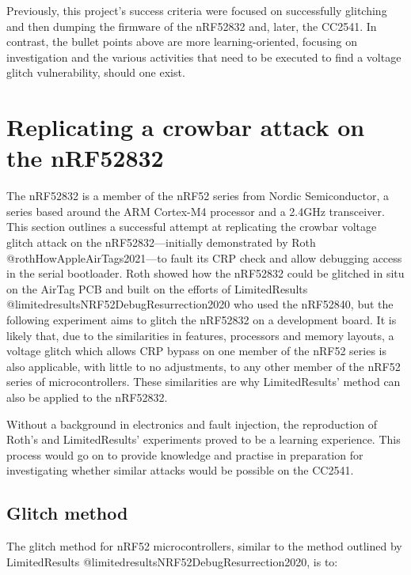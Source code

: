 Previously, this project's success criteria were focused on successfully
glitching and then dumping the firmware of the nRF52832 and, later, the
CC2541. In contrast, the bullet points above are more learning-oriented,
focusing on investigation and the various activities that need to be
executed to find a voltage glitch vulnerability, should one exist.

\hypertarget{replicating-a-crowbar-attack-on-the-nrf52832}{%
\section{Replicating a crowbar attack on the
nRF52832}\label{replicating-a-crowbar-attack-on-the-nrf52832}}

The nRF52832 is a member of the nRF52 series from Nordic Semiconductor,
a series based around the ARM Cortex-M4 processor and a 2.4GHz
transceiver. This section outlines a successful attempt at replicating
the crowbar voltage glitch attack on the nRF52832---initially
demonstrated by Roth @rothHowAppleAirTags2021---to fault its CRP check
and allow debugging access in the serial bootloader. Roth showed how the
nRF52832 could be glitched in situ on the AirTag PCB and built on the
efforts of LimitedResults @limitedresultsNRF52DebugResurrection2020 who
used the nRF52840, but the following experiment aims to glitch the
nRF52832 on a development board. It is likely that, due to the
similarities in features, processors and memory layouts, a voltage
glitch which allows CRP bypass on one member of the nRF52 series is also
applicable, with little to no adjustments, to any other member of the
nRF52 series of microcontrollers. These similarities are why
LimitedResults' method can also be applied to the nRF52832.

Without a background in electronics and fault injection, the
reproduction of Roth's and LimitedResults' experiments proved to be a
learning experience. This process would go on to provide knowledge and
practise in preparation for investigating whether similar attacks would
be possible on the CC2541.

\hypertarget{glitch-method}{%
\subsection{Glitch method}\label{glitch-method}}

The glitch method for nRF52 microcontrollers, similar to the method
outlined by LimitedResults @limitedresultsNRF52DebugResurrection2020, is
to:

